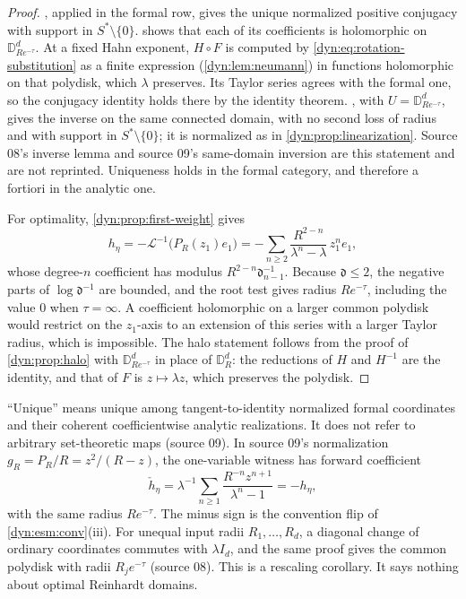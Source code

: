\documentclass[11pt,letterpaper]{article}
\theoremstyle{definition}
\theoremstyle{remark}
\newcommand{\Li}{\mathcal L}
\numberwithin{equation}{section}
\begin{document}
\begin{proof}
, applied in the formal row, gives the unique
normalized positive conjugacy with support in $S^{*}\setminus\{0\}$.
 shows that each of its coefficients is
holomorphic on $\mathbb D^{d}_{Re^{-\tau}}$. At a fixed Hahn exponent,
$H\circ F$ is computed by \eqref{dyn:eq:rotation-substitution} as a finite
expression (\cref{dyn:lem:neumann}) in functions holomorphic on that
polydisk, which $\lambda$ preserves. Its Taylor series agrees with the
formal one, so the conjugacy identity holds there by the identity theorem.
, with $U=\mathbb D^{d}_{Re^{-\tau}}$, gives the
inverse on the same connected domain, with no second loss of radius and with
support in $S^{*}\setminus\{0\}$; it is normalized as in
\cref{dyn:prop:linearization}. Source 08's inverse lemma and source 09's
same-domain inversion are this statement and are not reprinted. Uniqueness
holds in the formal category, and therefore a fortiori in the analytic one.

For optimality, \cref{dyn:prop:first-weight} gives
\[
 h_\eta=-\Li^{-1}\bigl(P_R(z_1)e_1\bigr)
 =-\sum_{n\ge2}\frac{R^{2-n}}{\lambda^{n}-\lambda}\,z_1^{n}e_1 ,
\]
whose degree-$n$ coefficient has modulus $R^{2-n}\mathfrak d_{n-1}^{-1}$.
Because $\mathfrak d\le2$, the negative parts of $\log\mathfrak d^{-1}$ are
bounded, and the root test gives radius $Re^{-\tau}$, including the value
$0$ when $\tau=\infty$. A coefficient holomorphic on a larger common
polydisk would restrict on the $z_1$-axis to an extension of this series with
a larger Taylor radius, which is impossible. The halo statement follows from
the proof of \cref{dyn:prop:halo} with $\mathbb D^{d}_{Re^{-\tau}}$ in place
of $\mathbb D^{d}_R$: the reductions of $H$ and $H^{-1}$ are the identity,
and that of $F$ is $z\mapsto\lambda z$, which preserves the polydisk.
\end{proof}

``Unique'' means unique among tangent-to-identity normalized formal
coordinates and their coherent coefficientwise analytic realizations. It does
not refer to arbitrary set-theoretic maps (source 09). In source 09's
normalization $g_R=P_R/R=z^{2}/(R-z)$, the one-variable witness has forward
coefficient
\[
 \check h_\eta=\lambda^{-1}\sum_{n\ge1}\frac{R^{-n}z^{n+1}}{\lambda^{n}-1}
 =-h_\eta,
\]
with the same radius $Re^{-\tau}$. The minus sign is the convention flip of
\cref{dyn:esm:conv}(iii). For unequal input radii $R_1,\dots,R_d$, a diagonal
change of ordinary coordinates commutes with $\lambda I_d$, and the same
proof gives the common polydisk with radii $R_je^{-\tau}$ (source 08). This
is a rescaling corollary. It says nothing about optimal Reinhardt domains.
\end{document}
